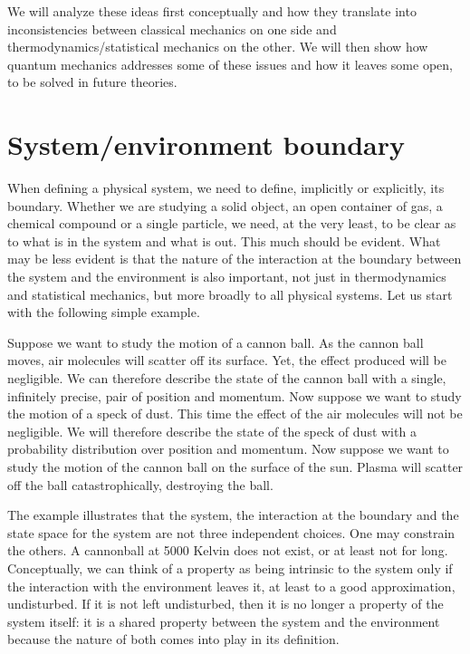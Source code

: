 \documentclass[10pt,twocolumn, nofootinbib]{revtex4-2}
\begin{document}
We will analyze these ideas first conceptually and how they translate into inconsistencies between classical mechanics on one side and thermodynamics/statistical mechanics on the other. We will then show how quantum mechanics addresses some of these issues and how it leaves some open, to be solved in future theories.

\section{System/environment boundary}

When defining a physical system, we need to define, implicitly or explicitly, its boundary. Whether we are studying a solid object, an open container of gas, a chemical compound or a single particle, we need, at the very least, to be clear as to what is in the system and what is out. This much should be evident. What may be less evident is that the nature of the interaction at the boundary between the system and the environment is also important, not just in thermodynamics and statistical mechanics, but more broadly to all physical systems. Let us start with the following simple example.

Suppose we want to study the motion of a cannon ball. As the cannon ball moves, air molecules will scatter off its surface. Yet, the effect produced will be negligible. We can therefore describe the state of the cannon ball with a single, infinitely precise, pair of position and momentum. Now suppose we want to study the motion of a speck of dust. This time the effect of the air molecules will not be negligible. We will therefore describe the state of the speck of dust with a probability distribution over position and momentum. Now suppose we want to study the motion of the cannon ball on the surface of the sun. Plasma will scatter off the ball catastrophically, destroying the ball. 

The example illustrates that the system, the interaction at the boundary and the state space for the system are not three independent choices. One may constrain the others. A cannonball at 5000 Kelvin does not exist, or at least not for long. Conceptually, we can think of a property as being intrinsic to the system only if the interaction with the environment leaves it, at least to a good approximation, undisturbed. If it is not left undisturbed, then it is no longer a property of the system itself: it is a shared property between the system and the environment because the nature of both comes into play in its definition.
\end{document}
